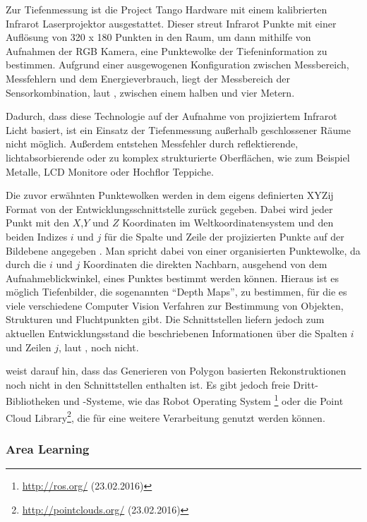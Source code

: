 Zur Tiefenmessung ist die Project Tango Hardware mit einem kalibrierten Infrarot Laserprojektor ausgestattet. Dieser streut Infrarot Punkte mit einer Auflösung von 320 x 180 Punkten in den Raum, um dann mithilfe von Aufnahmen der RGB Kamera, eine Punktewolke der Tiefeninformation zu bestimmen. Aufgrund einer ausgewogenen Konfiguration zwischen Messbereich, Messfehlern und dem Energieverbrauch, liegt der Messbereich der Sensorkombination, laut \citet{GoogleDevelopersConcepts:online}, zwischen einem halben und vier Metern. 

Dadurch, dass diese Technologie auf der Aufnahme von projiziertem Infrarot Licht basiert, ist ein Einsatz der Tiefenmessung außerhalb geschlossener Räume nicht möglich. \citep{GoogleDevelopersConcepts:online} Außerdem entstehen Messfehler durch reflektierende,  lichtabsorbierende oder zu komplex strukturierte Oberflächen, wie zum Beispiel Metalle, LCD Monitore oder Hochflor Teppiche. 

Die zuvor erwähnten Punktewolken werden in dem eigens definierten XYZij Format von der Entwicklungsschnittstelle zurück gegeben. Dabei wird jeder Punkt mit den \(X\),\(Y\) und \(Z\) Koordinaten im Weltkoordinatensystem und den beiden Indizes \(i \) und \(j \) für die Spalte und Zeile der projizierten Punkte auf der Bildebene angegeben \citep{GoogleDevelopersConcepts:online}. Man spricht dabei von einer organisierten Punktewolke, da durch die \(i\) und \(j\) Koordinaten die direkten Nachbarn, ausgehend von dem Aufnahmeblickwinkel, eines Punktes bestimmt werden können. Hieraus ist es möglich Tiefenbilder, die sogenannten \enquote{Depth Maps}, zu bestimmen, für die es viele verschiedene Computer Vision Verfahren zur Bestimmung von Objekten, Strukturen und Fluchtpunkten gibt. Die Schnittstellen liefern jedoch zum aktuellen Entwicklungsstand die beschriebenen Informationen über die Spalten \(i\) und Zeilen \(j\), laut \citet{GoogleDevelopersKnownIssues:online}, noch nicht.

\citet{GoogleDevelopersConcepts:online} weist darauf hin, dass das Generieren von Polygon basierten Rekonstruktionen noch nicht in den Schnittstellen enthalten ist. Es gibt jedoch freie Dritt-Bibliotheken und -Systeme, wie das Robot Operating System \footnote{\url{http://ros.org/} (23.02.2016)} oder die Point Cloud Library\footnote{\url{http://pointclouds.org/} (23.02.2016)}, die für eine weitere Verarbeitung genutzt werden können.

\subsubsection{Area Learning} \label{subsec:area-learning}

